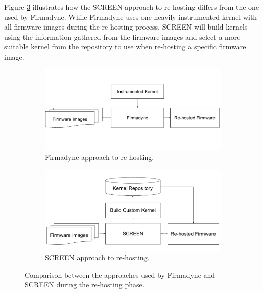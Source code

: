Figure \ref{fig:firmadyne-screen-compare} illustrates how the SCREEN approach to re-hosting differs from the one used by Firmadyne. While Firmadyne uses one heavily instrumented kernel with all firmware images during the re-hosting process, SCREEN will build kernels using the information gathered from the firmware images and select a more suitable kernel from the repository to use when re-hosting a specific firmware image.

\begin{figure}[h]
     \centering
     \begin{subfigure}[b]{0.45\textwidth}
         \centering
         \includegraphics[width=\textwidth]{figs/Firmadyne-Approach.pdf}
         \caption{Firmadyne approach to re-hosting.}
         \label{fig:firmadyne-approach}
     \end{subfigure}
     \hfill
     \begin{subfigure}[b]{0.45\textwidth}
         \centering
         \includegraphics[width=\textwidth]{figs/SCREEN-Approach.pdf}
         \caption{SCREEN approach to re-hosting.}
         \label{fig:screen-approach}
     \end{subfigure}
        \caption{Comparison between the approaches used by Firmadyne and SCREEN during the re-hosting phase.}
        \label{fig:firmadyne-screen-compare}
\end{figure}